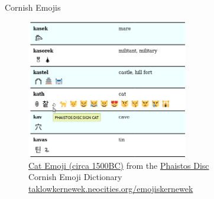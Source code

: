\documentclass[handout]{beamer}
\begin{document}
\begin{frame}[plain]{Cornish Emojis}
\begin{figure}
 \begin{center}
\includegraphics[width=7cm]{emojis_example.png}
 \end{center}
 \caption{\href{https://unicode-table.com/101ec}{Cat Emoji (circa 1500BC)} from the \href{https://unicode-table.com/en/blocks/phaistos-disc/}{Phaistos Disc}\\
 Cornish Emoji Dictionary \href{https://taklowkernewek.neocities.org/emojiskernewek}{taklowkernewek.neocities.org/emojiskernewek}}
 \label{fig:emojis}
\end{figure}
\end{frame}
\end{document}
